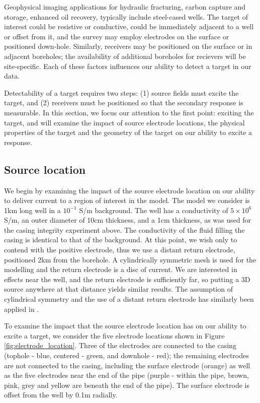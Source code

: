 Geophysical imaging applications for hydraulic fracturing, carbon capture and storage, enhanced oil recovery, typically include steel-cased wells. The target of interest could be resistive or conductive, could be immediately adjacent to a well or offset from it, and the survey may employ electrodes on the surface or positioned down-hole. Similarly, receivers may be positioned on the surface or in adjacent boreholes; the availability of additional boreholes for recievers will be site-specific. Each of these factors influences our ability to detect a target in our data.

Detectability of a target requires two steps: (1) source fields must excite the target, and (2) receivers must be positioned so that the secondary response is measurable. In this section, we focus our attention to the first point: exciting the target, and will examine the impact of source electrode locations, the physical properties of the target and the geometry of the target on our ability to excite a response.
\subsection{Source location}
We begin by examining the impact of the source electrode location on our ability to deliver current to a region of interest in the model. The model we consider is 1km long well in a $10^{-1}$ S/m background. The well has a conductivity of $5 \times 10^6$ S/m, an outer diameter of 10cm thickness, and a 1cm thickness, as was used for the casing integrity experiment above. The conductivity of the fluid filling the casing is identical to that of the background. At this point, we wish only to contend with the positive electrode, thus we use a distant return electrode, positioned 2km from the borehole. A cylindrically symmetric mesh is used for the modelling and the return electrode is a disc of current. We are interested in effects near the well, and the return electrode is sufficiently far, so putting a 3D source anywhere at that distance yields similar results. The assumption of cylindrical symmetry and the use of a distant return electrode has similarly been applied in \cite{Schenkel1991}.

To examine the impact that the source electrode location has on our ability to excite a target, we consider the five electrode locations shown in Figure \ref{fig:electrode_location}. Three of the electrodes are connected to the casing (tophole - blue, centered - green, and downhole - red); the remaining electrodes are  not connected to the casing, including the surface electrode (orange) as well as the five electrodes near the end of the pipe (purple - within the pipe, brown, pink, grey and yellow are beneath the end of the pipe). The surface electrode is offset from the well by 0.1m radially.



